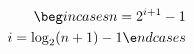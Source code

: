 \documentclass[preview]{standalone}
\begin{document}
\begin{align*}
\beg i n {cases}  n  = 2^{  i  + 1} - 1 \\ i  = \log_2( n  + 1) - 1\e n d{cases}
\end{align*}
\end{document}

